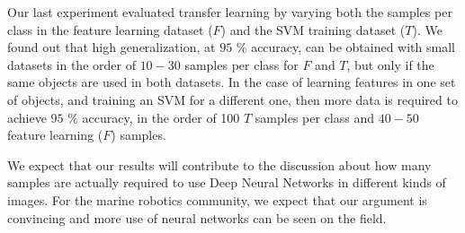 Our last experiment evaluated transfer learning by varying both the samples per class in the feature learning dataset ($F$) and the SVM training dataset ($T$). We found out that high generalization, at $95$ \% accuracy, can be obtained with small datasets in the order of $10-30$ samples per class for $F$ and $T$, but only if the same objects are used in both datasets. In the case of learning features in one set of objects, and training an SVM for a different one, then more data is required to achieve $95$ \% accuracy, in the order of 100 $T$ samples per class and $40-50$ feature learning ($F$) samples.

We expect that our results will contribute to the discussion about how many samples are actually required to use Deep Neural Networks in different kinds of images. For the marine robotics community, we expect that our argument is convincing and more use of neural networks can be seen on the field.
